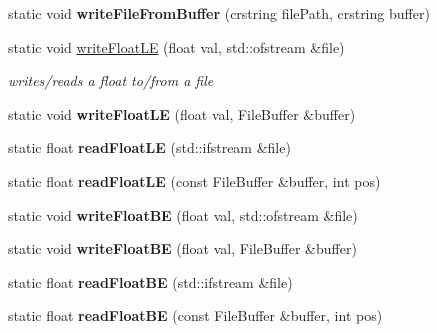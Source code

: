 \begin{DoxyCompactItemize}
\mbox{\label{classnta_1_1IOManager_a88a69469ca9a8c4a632e7d7e14ae3d79}} 
static void {\bfseries write\+File\+From\+Buffer} (crstring file\+Path, crstring buffer)
\item 
\mbox{\label{classnta_1_1IOManager_aa9855baef3ed91e4e95e3a5e899ba473}} 
static void \hyperlink{classnta_1_1IOManager_aa9855baef3ed91e4e95e3a5e899ba473}{write\+Float\+LE} (float val, std\+::ofstream \&file)
\begin{DoxyCompactList}\small\item\em writes/reads a float to/from a file \end{DoxyCompactList}\item 
\mbox{\label{classnta_1_1IOManager_adc695b9f45e8eed4224ab1889619883c}} 
static void {\bfseries write\+Float\+LE} (float val, File\+Buffer \&buffer)
\item 
\mbox{\label{classnta_1_1IOManager_aeb9265151298c4c9f5868ec7624eee2a}} 
static float {\bfseries read\+Float\+LE} (std\+::ifstream \&file)
\item 
\mbox{\label{classnta_1_1IOManager_ab96b9f46c4a0deeb326d3eea844b1898}} 
static float {\bfseries read\+Float\+LE} (const File\+Buffer \&buffer, int pos)
\item 
\mbox{\label{classnta_1_1IOManager_ae5350032528c4909c5c23bb771f969fd}} 
static void {\bfseries write\+Float\+BE} (float val, std\+::ofstream \&file)
\item 
\mbox{\label{classnta_1_1IOManager_a9dd584ae18cdb0f9a5277e2b5b9a44ff}} 
static void {\bfseries write\+Float\+BE} (float val, File\+Buffer \&buffer)
\item 
\mbox{\label{classnta_1_1IOManager_a4c7e24624617b27fe3292bc93f932f93}} 
static float {\bfseries read\+Float\+BE} (std\+::ifstream \&file)
\item 
\mbox{\label{classnta_1_1IOManager_a9874eea8a64cd1407a5841232cdae3c6}} 
static float {\bfseries read\+Float\+BE} (const File\+Buffer \&buffer, int pos)

\end{DoxyCompactItemize}
